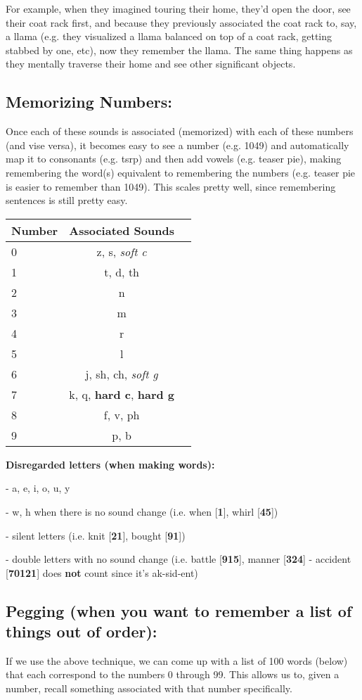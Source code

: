 \documentclass{article}
\newcommand\ssc[2][\DefaultOpt]{%
  \def\DefaultOpt{#2}%
  \subsection[#1]{#2}%
}
\begin{document}
{{For example, when they imagined touring their home, they'd open the door, see their coat rack first, and because they previously associated the coat rack to, say, a llama (e.g. they visualized a llama balanced on top of a coat rack, getting stabbed by one, etc), now they remember the llama. The same thing happens as they mentally traverse their home and see other significant objects.

}

\newpage

\ssc{Memorizing Numbers:}{

Once each of these sounds is associated (memorized) with each of these numbers (and vise versa), it becomes easy to see a number (e.g. 1049) and automatically map it to consonants (e.g. tsrp) and then add vowels (e.g. teaser pie), making remembering the word(s) equivalent to remembering the numbers (e.g. teaser pie is easier to remember than 1049). This scales pretty well, since remembering sentences is still pretty easy.

\begin{tabular}{l|cc}
  Number & Associated Sounds\\
  \hline
  0 & z, s, \textit{soft c} \\
  1 & t, d, th \\
  2 & n \\
  3 & m \\
  4 & r \\
  5 & l \\
  6 & j, sh, ch, \textit{soft g} \\
  7 & k, q, \textbf{hard c}, \textbf{hard g} \\
  8 & f, v, ph \\
  9 & p, b 
\end{tabular}

\textbf{Disregarded letters (when making words):}

- a, e, i, o, u, y

- w, h when there is no sound change (i.e. when [\textbf{1}], whirl [\textbf{45}])

- silent letters (i.e. knit [\textbf{21}], bought [\textbf{91}])

- double letters with no sound change (i.e. battle [\textbf{915}], manner [\textbf{324}] - accident [\textbf{70121}] does \textbf{not} count since it's ak-sid-ent)
}
\ssc{Pegging (when you want to remember a list of things out of order):}{

If we use the above technique, we can come up with a list of 100 words (below) that each correspond to the numbers 0 through 99. This allows us to, given a number, recall something associated with that number specifically.

}}
\end{document}
